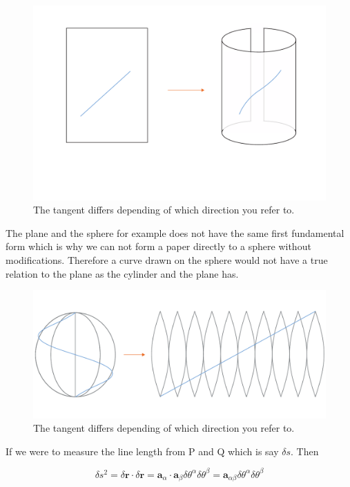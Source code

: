 \begin{figure}[H]
\centering
\includegraphics[width=0.9\linewidth ]{figure/Theory/FirstFundamental.pdf}
\caption{The tangent differs depending of which direction you refer to. }
\end{figure}

The plane and the sphere for example does not have the same first fundamental form which is why we can not form a paper directly to a sphere without modifications. Therefore a curve drawn on the sphere would not have a true relation to the plane as the cylinder and the plane has.

\begin{figure}[H]
\centering
\includegraphics[width=0.9\linewidth ]{figure/Theory/unrollSurfMod.pdf}
\caption{The tangent differs depending of which direction you refer to. }
\end{figure}


If we were to measure the line length from P and Q which is say $\delta s$. Then 

\begin{equation}
\delta s^2 = \delta \textbf{r} \cdot \delta \textbf{r} =  \textbf{a}_\alpha \cdot \textbf{a}_\beta \delta\theta^\alpha \delta\theta^\beta =  \textbf{a}_{\alpha\beta} \delta\theta^\alpha \delta\theta^\beta 
\end{equation}

